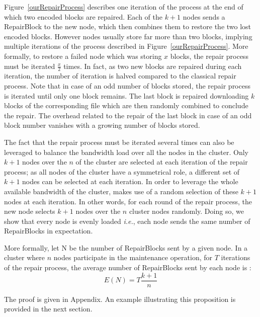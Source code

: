Figure~\ref{ourRepairProcess} describes one iteration of the process at the end of which two encoded blocks are repaired. Each of the $k+1$ nodes sends a RepairBlock to the new node, which then combines them to restore the two lost encoded blocks. However nodes usually store far more than two blocks, implying multiple iterations of the process described in Figure~\ref{ourRepairProcess}.
More formally, to restore a failed node which was storing $x$ blocks, the repair process must be iterated $\frac{x}{2}$ times. In fact, as two new blocks are repaired during each iteration, the number of iteration is halved compared to the classical repair process.
Note that in case of an odd number of blocks stored, the repair process is iterated until only one block remains. The last block is repaired downloading $k$ blocks of the corresponding file which are then randomly combined to conclude the repair. The overhead related to the repair of the last block in case of an odd block number vanishes with a growing number of blocks stored. 



The fact that the repair process must be iterated several times can also be leveraged to balance the bandwidth load over all the nodes in the cluster.
Only $k+1$ nodes over the $n$ of the cluster are selected at each iteration of the repair process; as all nodes of the cluster have a symmetrical role, a different set of $k+1$ nodes can be selected at each iteration.
In order to leverage the whole available bandwidth of the cluster, \crc makes use of a random selection of these $k+1$ nodes at each iteration.
In other words, for each round of the repair process, the new node selects $k+1$ nodes over the $n$ cluster nodes randomly. 
Doing so, we show that every node is evenly loaded \emph{i.e.}, each node sends the same number of RepairBlocks in expectation. 

More formally, let N be the number of RepairBlocks sent by a given node. In a cluster where $n$ nodes participate in the maintenance operation, for $T$ iterations of the repair process, the average number of RepairBlocks sent by each node is : 
\begin{equation}
\label{meanLoad}
E(N) = T\frac{k+1}{n}
\end{equation} 

The proof is given in Appendix.
An example illustrating this proposition is provided in the next section.


